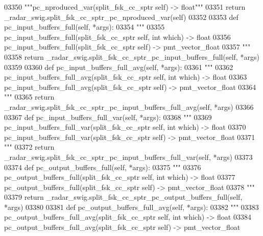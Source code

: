 \begin{DoxyCode}
{{{{{{{{{{{{03350         \textcolor{stringliteral}{"""pc\_nproduced\_var(split\_fsk\_cc\_sptr self) -> float"""}
03351         \textcolor{keywordflow}{return} \_radar\_swig.split\_fsk\_cc\_sptr\_pc\_nproduced\_var(self)
03352 
03353     \textcolor{keyword}{def }pc_input_buffers_full(self, *args):
03354         \textcolor{stringliteral}{"""}
03355 \textcolor{stringliteral}{        pc\_input\_buffers\_full(split\_fsk\_cc\_sptr self, int which) -> float}
03356 \textcolor{stringliteral}{        pc\_input\_buffers\_full(split\_fsk\_cc\_sptr self) -> pmt\_vector\_float}
03357 \textcolor{stringliteral}{        """}
03358         \textcolor{keywordflow}{return} \_radar\_swig.split\_fsk\_cc\_sptr\_pc\_input\_buffers\_full(self, *args)
03359 
03360     \textcolor{keyword}{def }pc_input_buffers_full_avg(self, *args):
03361         \textcolor{stringliteral}{"""}
03362 \textcolor{stringliteral}{        pc\_input\_buffers\_full\_avg(split\_fsk\_cc\_sptr self, int which) -> float}
03363 \textcolor{stringliteral}{        pc\_input\_buffers\_full\_avg(split\_fsk\_cc\_sptr self) -> pmt\_vector\_float}
03364 \textcolor{stringliteral}{        """}
03365         \textcolor{keywordflow}{return} \_radar\_swig.split\_fsk\_cc\_sptr\_pc\_input\_buffers\_full\_avg(self, *args)
03366 
03367     \textcolor{keyword}{def }pc_input_buffers_full_var(self, *args):
03368         \textcolor{stringliteral}{"""}
03369 \textcolor{stringliteral}{        pc\_input\_buffers\_full\_var(split\_fsk\_cc\_sptr self, int which) -> float}
03370 \textcolor{stringliteral}{        pc\_input\_buffers\_full\_var(split\_fsk\_cc\_sptr self) -> pmt\_vector\_float}
03371 \textcolor{stringliteral}{        """}
03372         \textcolor{keywordflow}{return} \_radar\_swig.split\_fsk\_cc\_sptr\_pc\_input\_buffers\_full\_var(self, *args)
03373 
03374     \textcolor{keyword}{def }pc_output_buffers_full(self, *args):
03375         \textcolor{stringliteral}{"""}
03376 \textcolor{stringliteral}{        pc\_output\_buffers\_full(split\_fsk\_cc\_sptr self, int which) -> float}
03377 \textcolor{stringliteral}{        pc\_output\_buffers\_full(split\_fsk\_cc\_sptr self) -> pmt\_vector\_float}
03378 \textcolor{stringliteral}{        """}
03379         \textcolor{keywordflow}{return} \_radar\_swig.split\_fsk\_cc\_sptr\_pc\_output\_buffers\_full(self, *args)
03380 
03381     \textcolor{keyword}{def }pc_output_buffers_full_avg(self, *args):
03382         \textcolor{stringliteral}{"""}
03383 \textcolor{stringliteral}{        pc\_output\_buffers\_full\_avg(split\_fsk\_cc\_sptr self, int which) -> float}
03384 \textcolor{stringliteral}{        pc\_output\_buffers\_full\_avg(split\_fsk\_cc\_sptr self) -> pmt\_vector\_float}
}}}}}}}}}}}}
\end{DoxyCode}
